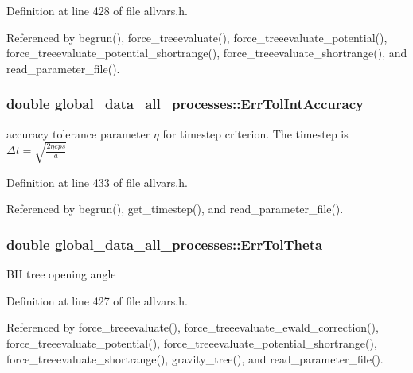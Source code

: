 Definition at line 428 of file allvars.h.



Referenced by begrun(), force\_\-treeevaluate(), force\_\-treeevaluate\_\-potential(), force\_\-treeevaluate\_\-potential\_\-shortrange(), force\_\-treeevaluate\_\-shortrange(), and read\_\-parameter\_\-file().

\hypertarget{structglobal__data__all__processes_a73f3a95e03513c038cf3215a2204bce4}{
\subsubsection[{ErrTolIntAccuracy}]{\setlength{\rightskip}{0pt plus 5cm}double {\bf global\_\-data\_\-all\_\-processes::ErrTolIntAccuracy}}}
\label{structglobal__data__all__processes_a73f3a95e03513c038cf3215a2204bce4}
accuracy tolerance parameter $ \eta $ for timestep criterion. The timestep is $ \Delta t = \sqrt{\frac{2 \eta eps}{a}} $ 

Definition at line 433 of file allvars.h.



Referenced by begrun(), get\_\-timestep(), and read\_\-parameter\_\-file().

\hypertarget{structglobal__data__all__processes_ac3edc89fa5616655618ddccb430e3dfe}{
\subsubsection[{ErrTolTheta}]{\setlength{\rightskip}{0pt plus 5cm}double {\bf global\_\-data\_\-all\_\-processes::ErrTolTheta}}}
\label{structglobal__data__all__processes_ac3edc89fa5616655618ddccb430e3dfe}
BH tree opening angle 

Definition at line 427 of file allvars.h.



Referenced by force\_\-treeevaluate(), force\_\-treeevaluate\_\-ewald\_\-correction(), force\_\-treeevaluate\_\-potential(), force\_\-treeevaluate\_\-potential\_\-shortrange(), force\_\-treeevaluate\_\-shortrange(), gravity\_\-tree(), and read\_\-parameter\_\-file().

